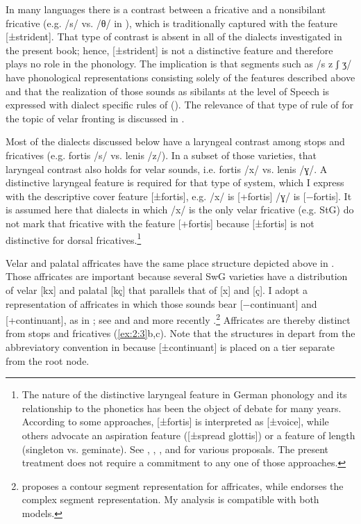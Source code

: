 In many languages there is a contrast between a  fricative and a nonsibilant fricative (e.g. /s/ vs. /θ/ in ), which is traditionally captured with the feature [±strident]. That type of contrast is absent in all of the dialects investigated in the present book; hence, [±strident] is not a distinctive feature and therefore plays no role in the phonology. The implication is that segments such as /s z ʃ ʒ/ have phonological representations consisting solely of the features described above and that the realization of those sounds as sibilants at the level of Speech is expressed with dialect specific rules of  (). The relevance of that type of rule of  for the topic of velar fronting is discussed in .

Most of the dialects discussed below have a laryngeal contrast among stops and fricatives (e.g. fortis /s/ vs. lenis /z/). In a subset of those varieties, that laryngeal contrast also holds for velar sounds, i.e. fortis /x/ vs. lenis /ɣ/. A distinctive laryngeal feature is required for that type of system, which I express with the descriptive cover feature [±fortis], e.g. /x/ is [+fortis] /ɣ/ is [−fortis]. It is assumed here that dialects in which /x/ is the only velar fricative (e.g. StG) do not mark that fricative with the feature [+fortis] because [±fortis] is not distinctive for dorsal fricatives.\footnote{The nature of the distinctive laryngeal feature in German phonology and its relationship to the phonetics has been the object of debate for many years. According to some approaches, [±fortis] is interpreted as [±voice], while others advocate an aspiration feature ([±spread glottis]) or a feature of length (singleton vs. geminate). See \citet{IversonSalmons1995}, \citet{Wiese1996a}, \citet{JessenRingen2002}, and \citet{BeckmanRingen2009} for various proposals. The present treatment does not require a commitment to any one of those approaches.}

Velar and palatal affricates have the same place structure depicted above in . Those affricates are important because several SwG varieties have a distribution of velar [kx] and palatal [kç] that parallels that of [x] and [ç]. I adopt a representation of affricates in which those sounds bear [−continuant] and [+continuant], as in ; see \citet{Sagey1986} and \citet{Lombardi1990} and more recently \citet{Hall2012}.\footnote{\citet{Sagey1986} proposes a contour segment representation for affricates, while \citet{Lombardi1990} endorses the complex segment representation. My analysis is compatible with both models.} Affricates are thereby distinct from stops and fricatives (\ref{ex:2:3}b,c). Note that the structures in  depart from the abbreviatory convention in  because [±continuant] is placed on a tier separate from the root node.


